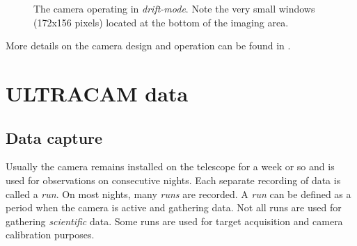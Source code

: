 \begin{figure}  
  \centering
  \setlength{\fboxsep}{0pt}
  \setlength{\fboxrule}{1pt}
  \caption{The camera operating in \emph{drift-mode}. Note the very small windows (172x156 pixels) located at the bottom of the imaging area.}
  \label{fig:V834Cen}
\end{figure}

More details on the camera design and operation can be found in \cite{dhillon07}.

\section{ULTRACAM data}

\subsection{Data capture}
Usually the camera remains installed on the telescope for a week or so and is used for observations on consecutive nights. Each separate recording of data is called a \emph{run}. On most nights, many \emph{runs} are recorded. A \emph{run} can be defined as a period when the camera is active and gathering data. Not all runs are used for gathering \emph{scientific} data. Some runs are used for target acquisition and camera calibration purposes. 

